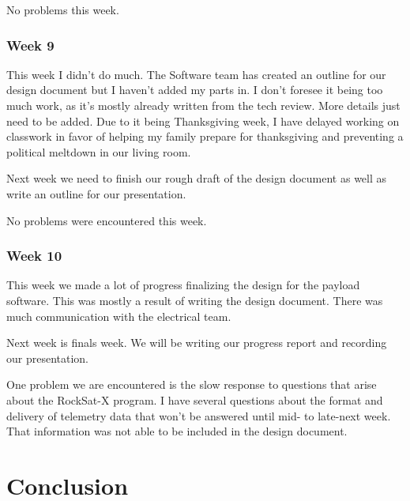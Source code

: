 \documentclass[letterpaper,10pt]{article}
\begin{document}
No problems this week.

\subsubsection{Week 9}
This week I didn't do much. The Software team has created an outline for our design document but I haven't added my parts in. I don't foresee it being too much work, as it's mostly already written from the tech review. More details just need to be added. Due to it being Thanksgiving week, I have delayed working on classwork in favor of helping my family prepare for thanksgiving and preventing a political meltdown in our living room.

Next week we need to finish our rough draft of the design document as well as write an outline for our presentation.

No problems were encountered this week.

\subsubsection{Week 10}
This week we made a lot of progress finalizing the design for the payload software. This was mostly a result of writing the design document. There was much communication with the electrical team.

Next week is finals week. We will be writing our progress report and recording our presentation.

One problem we are encountered is the slow response to questions that arise about the RockSat-X program. I have several questions about the format and delivery of telemetry data that won't be answered until mid- to late-next week. That information was not able to be included in the design document.

\section{Conclusion}
\end{document}
